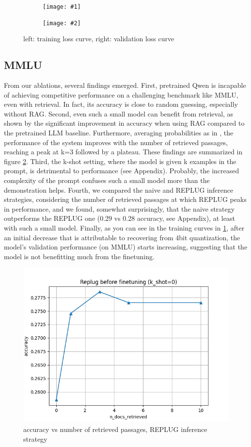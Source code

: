 \documentclass[11pt]{article}
\newcommand{\sideBySideImages}[5]{%
    \begin{figure}[ht]
        \centering
        \begin{subfigure}{#3\linewidth}
            \centering
            \texttt{[image: \#1]}
        \end{subfigure}%
        \hfill%
        \begin{subfigure}{#3\linewidth}
            \centering
            \texttt{[image: \#2]}
        \end{subfigure}
        \caption{#5}
        \label{#4}
    \end{figure}
}
\begin{document}
\sideBySideImages{figures/train-loss.png}{figures/val-loss.png}{0.48}{fig:training_curves}{left: training loss curve, right: validation loss curve}

\subsection{MMLU}

From our ablations, several findings emerged. First, pretrained Qwen is incapable of achieving competitive performance on a 
challenging benchmark like MMLU, even with retrieval. In fact, its accuracy is close to random guessing, especially without RAG.
Second, even such a small model can benefit from retrieval, as shown by the significant improvement in accuracy when using RAG compared
to the pretrained LLM baseline. Furthermore, averaging probabilities as in \cite{replug}, the performance of the system improves with the
number of retrieved passages, reaching a peak at k=3 followed by a plateau. These findings are summarized in figure \ref{fig:mmlu_passages}.
Third, the k-shot setting, where the model is given k examples in the prompt, is detrimental to performance (see Appendix). Probably, the 
increased complexity of the prompt confuses such a small model more than the demonstration helps. Fourth, we compared the naive and REPLUG
inference strategies, considering the number of retrieved passages at which REPLUG peaks in performance, and we found, somewhat surprisingly,
that the naive strategy outperforms the REPLUG one (0.29 vs 0.28 accuracy, see Appendix), at least with such a small model.
Finally, as you can see in the training curves in \ref{fig:training_curves}, after an initial decrease that is attributable to recovering from 4bit
quantization, the model's validation performance (on MMLU) starts increasing, suggesting that the model is not benefitting much from the finetuning.

\begin{figure}[h]
    \centering
    \includegraphics[width=0.8\linewidth]{figures/replug_before_finetuning.png}
    \caption{accuracy vs number of retrieved passages, REPLUG inference strategy}
    \label{fig:mmlu_passages}
\end{figure}
\end{document}
